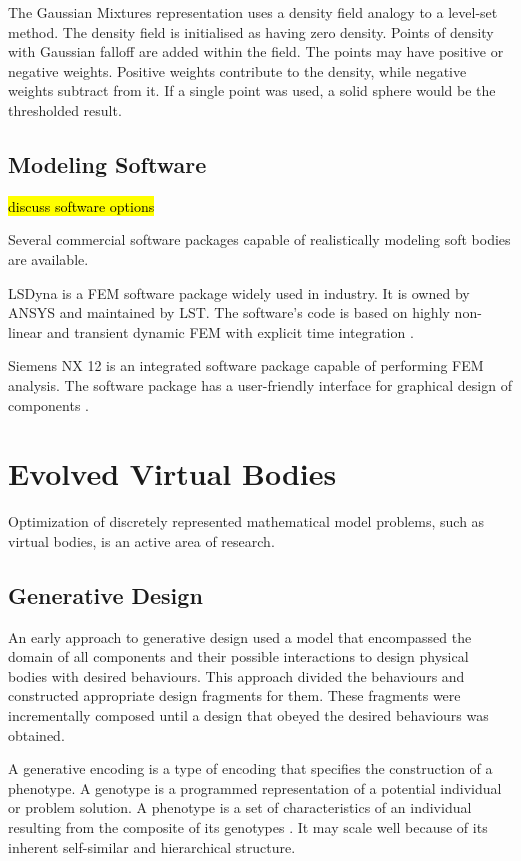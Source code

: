 The Gaussian Mixtures representation uses a density field analogy to a level-set method. The density field is initialised as having zero density. Points of density with Gaussian falloff are added within the field. The points may have positive or negative weights. Positive weights contribute to the density, while negative weights subtract from it. If a single point was used, a solid sphere would be the thresholded result. 

\subsection{Modeling Software}

\hl{discuss software options}

Several commercial software packages capable of realistically modeling soft bodies are available.

LSDyna is a FEM software package widely used in industry. It is owned by ANSYS and maintained by LST. The software's code is based on highly non-linear and transient dynamic FEM with explicit time integration \cite{LS-Dyna}.

Siemens NX 12 is an integrated software package capable of performing FEM analysis. The software package has a user-friendly interface for graphical design of components \cite{Siemens}.


\section{Evolved Virtual Bodies}

Optimization of discretely represented mathematical model problems, such as virtual bodies, is an active area of research.

\subsection{Generative Design}

An early approach to generative design used a model that encompassed the domain of all components and their possible interactions to design physical bodies with desired behaviours. This approach divided the behaviours and constructed appropriate design fragments for them. These fragments were incrementally composed until a design that obeyed the desired behaviours was obtained. \cite{Brose1993} 

A generative encoding is a type of encoding that specifies the construction of a phenotype. A genotype is a programmed representation of a potential individual or problem solution. A phenotype is a set of characteristics of an individual resulting from the composite of its genotypes \cite{Sims1994a}. It may scale well because of its inherent self-similar and hierarchical structure. \cite{Hornby2001b}

